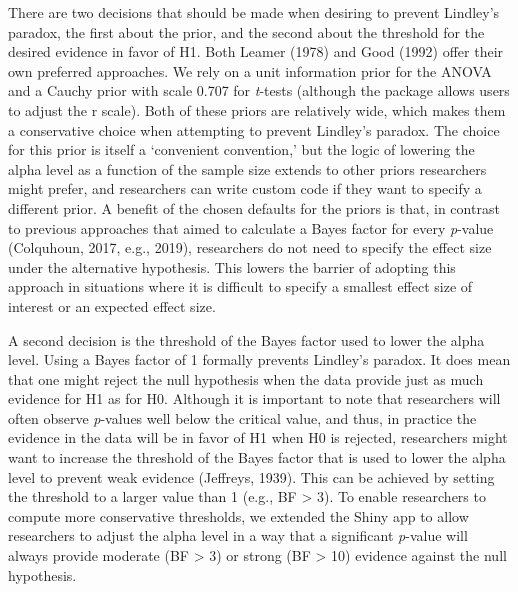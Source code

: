 \documentclass[
  english,
  ,jou, a4paper,floatsintext]{apa6}
\begin{document}
There are two decisions that should be made when desiring to prevent Lindley's paradox, the first about the prior, and the second about the threshold for the desired evidence in favor of H1. Both Leamer (1978) and Good (1992) offer their own preferred approaches. We rely on a unit information prior for the ANOVA and a Cauchy prior with scale 0.707 for \emph{t}-tests (although the package allows users to adjust the r scale). Both of these priors are relatively wide, which makes them a conservative choice when attempting to prevent Lindley's paradox. The choice for this prior is itself a `convenient convention,' but the logic of lowering the alpha level as a function of the sample size extends to other priors researchers might prefer, and researchers can write custom code if they want to specify a different prior. A benefit of the chosen defaults for the priors is that, in contrast to previous approaches that aimed to calculate a Bayes factor for every \emph{p}-value (Colquhoun, 2017, e.g., 2019), researchers do not need to specify the effect size under the alternative hypothesis. This lowers the barrier of adopting this approach in situations where it is difficult to specify a smallest effect size of interest or an expected effect size.

A second decision is the threshold of the Bayes factor used to lower the alpha level. Using a Bayes factor of 1 formally prevents Lindley's paradox. It does mean that one might reject the null hypothesis when the data provide just as much evidence for H1 as for H0. Although it is important to note that researchers will often observe \emph{p}-values well below the critical value, and thus, in practice the evidence in the data will be in favor of H1 when H0 is rejected, researchers might want to increase the threshold of the Bayes factor that is used to lower the alpha level to prevent weak evidence (Jeffreys, 1939). This can be achieved by setting the threshold to a larger value than 1 (e.g., BF \textgreater{} 3). To enable researchers to compute more conservative thresholds, we extended the Shiny app to allow researchers to adjust the alpha level in a way that a significant \emph{p}-value will always provide moderate (BF \textgreater{} 3) or strong (BF \textgreater{} 10) evidence against the null hypothesis.
\end{document}
